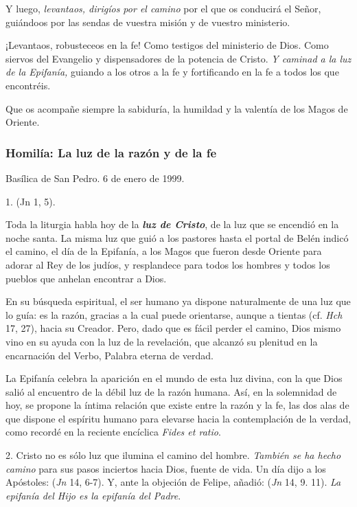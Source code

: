 \begin{body}
\begin{body}
Y luego, \emph{levantaos, dirigíos por el camino} por el que os conducirá el Señor, guiándoos por las sendas de vuestra misión y de vuestro ministerio.

¡Levantaos, robusteceos en la fe! Como testigos del ministerio de Dios. Como siervos del Evangelio y dispensadores de la potencia de Cristo. \emph{Y caminad a la luz de la Epifanía,} guiando a los otros a la fe y fortificando en la fe a todos los que encontréis.

Que os acompañe siempre la sabiduría, la humildad y la valentía de los Magos de Oriente.

\subsubsection{Homilía: La luz de la razón y de la fe}

Basílica de San Pedro. 6 de enero de 1999.

1.  (Jn 1, 5).

Toda la liturgia habla hoy de la \emph{\textbf{luz de Cristo}}, de la luz que se encendió en la noche santa. La misma luz que guió a los pastores hasta el portal de Belén indicó el camino, el día de la Epifanía, a los Magos que fueron desde Oriente para adorar al Rey de los judíos, y resplandece para todos los hombres y todos los pueblos que anhelan encontrar a Dios.

En su búsqueda espiritual, el ser humano ya dispone naturalmente de una luz que lo guía: es la razón, gracias a la cual puede orientarse, aunque a tientas (cf. \emph{Hch} 17, 27), hacia su Creador. Pero, dado que es fácil perder el camino, Dios mismo vino en su ayuda con la luz de la revelación, que alcanzó su plenitud en la encarnación del Verbo, Palabra eterna de verdad.

La Epifanía celebra la aparición en el mundo de esta luz divina, con la que Dios salió al encuentro de la débil luz de la razón humana. Así, en la solemnidad de hoy, se propone la íntima relación que existe entre la razón y la fe, las dos alas de que dispone el espíritu humano para elevarse hacia la contemplación de la verdad, como recordé en la reciente encíclica \emph{Fides et ratio}.

2. Cristo no es sólo luz que ilumina el camino del hombre. \emph{También se ha hecho camino} para sus pasos inciertos hacia Dios, fuente de vida. Un día dijo a los Apóstoles:  (\emph{Jn} 14, 6-7). Y, ante la objeción de Felipe, añadió:  (\emph{Jn} 14, 9. 11). \emph{La epifanía del Hijo es la epifanía del Padre}.


\end{body}
\end{body}
